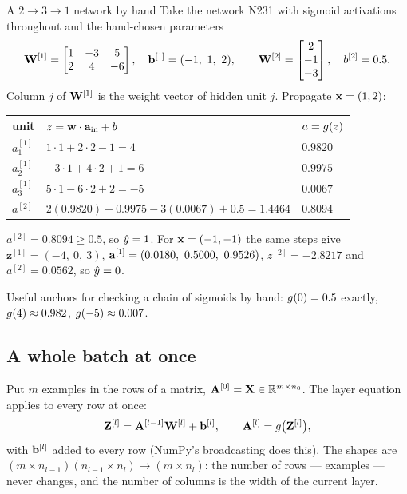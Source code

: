 \begin{workedexample}{A $2\to3\to1$ network by hand}
Take the network N231 with sigmoid activations throughout and the hand-chosen
parameters
\[
  \mathbf{W}^{[1]} = \begin{bmatrix} 1 & -3 & 5\\ 2 & 4 & -6\end{bmatrix},\quad
  \mathbf{b}^{[1]} = (-1,\ 1,\ 2),\qquad
  \mathbf{W}^{[2]} = \begin{bmatrix} 2\\ -1\\ -3\end{bmatrix},\quad
  b^{[2]} = 0.5 .
\]
Column $j$ of $\mathbf{W}^{[1]}$ is the weight vector of hidden unit $j$. Propagate
$\mathbf{x} = (1, 2)$:

\begin{center}
\small
\renewcommand{\arraystretch}{1.2}
\begin{tabular}{@{}lll@{}}
\toprule
unit & $z = \mathbf{w}\cdot\mathbf{a}_{\text{in}} + b$ & $a = g(z)$\\
\midrule
$a^{[1]}_1$ & $1\cdot1 + 2\cdot2 - 1 = 4$     & $0.9820$\\
$a^{[1]}_2$ & $-3\cdot1 + 4\cdot2 + 1 = 6$    & $0.9975$\\
$a^{[1]}_3$ & $5\cdot1 - 6\cdot2 + 2 = -5$    & $0.0067$\\
\midrule
$a^{[2]}$   & $2(0.9820) - 0.9975 - 3(0.0067) + 0.5 = 1.4464$ & $\mathbf{0.8094}$\\
\bottomrule
\end{tabular}
\end{center}

$a^{[2]} = 0.8094 \ge 0.5$, so $\hat{y} = 1$. For $\mathbf{x} = (-1,-1)$ the same steps
give $\mathbf{z}^{[1]} = (-4,\ 0,\ 3)$,
$\va^{[1]} = (0.0180,\ 0.5000,\ 0.9526)$, $z^{[2]} = -2.8217$ and
$a^{[2]} = 0.0562$, so $\hat{y} = 0$.

Useful anchors for checking a chain of sigmoids by hand: $g(0) = 0.5$
exactly, $g(4) \approx 0.982$, $g(-5) \approx 0.007$.
\end{workedexample}

\subsection{A whole batch at once}

Put $m$ examples in the rows of a matrix, $\mathbf{A}^{[0]} = \mathbf{X} \in
\mathbb{R}^{m\times n_0}$. The layer equation applies to every row at once:
\[
  \mathbf{Z}^{[l]} = \mathbf{A}^{[l-1]}\mathbf{W}^{[l]} + \mathbf{b}^{[l]},\qquad
  \mathbf{A}^{[l]} = g\bigl(\mathbf{Z}^{[l]}\bigr),
\]
with $\mathbf{b}^{[l]}$ added to every row (NumPy's broadcasting does this). The shapes
are $(m\times n_{l-1})(n_{l-1}\times n_l)\to(m\times n_l)$: the number of rows
--- examples --- never changes, and the number of columns is the width of the
current layer.


